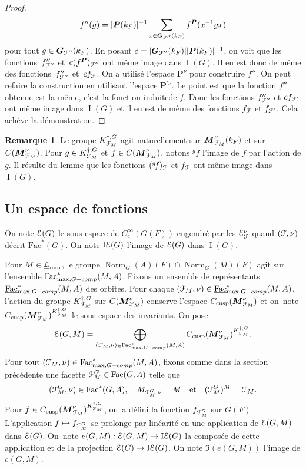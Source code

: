 \documentclass[11pt]{article}
\numberwithin{equation}{section}\providecommand{\og}{«\,}\providecommand{\fg}{\,»}
\let\mathcal \EuScript
\newcommand{\quadet}{\quad\text{et}\quad}
\newcommand\mto{\mathchoice{\longmapsto}{\mapsto}{\mapsto}{\mapsto}}
\newcommand{\gf}{{}^g\!f}
\newcommand{\rc}{\mathrm{c}}
\newcommand{\tcomp}{\textup{-comp}}
\newcommand{\cusp}{\mathrm{cusp}}
\newcommand{\Fac}{\mathrm{Fac}}
\DeclareMathOperator{\rI}{I}
\DeclareMathOperator{\rIE}{I\cE}
\DeclareMathOperator{\Norm}{Norm}
\newcommand{\bG}{\boldsymbol{G}}
\newcommand{\bM}{\boldsymbol{M}}
\newcommand{\bP}{\boldsymbol{P}}
\newcommand{\cE}{\mathcal{E}}
\newcommand{\cF}{\mathcal{F}}
\newcommand{\cL}{\mathcal{L}}
\theoremstyle{plain}
\theoremstyle{definition}
\newtheorem*{rem*}{Remarque}
\begin{document}
\begin{proof}
\[
f''(g)=\vert \bP(k_{F})\vert ^{-1}\sum_{x\in \bG_{\cF''}(k_{F})}f^{\bP}(x^{-1}gx)
\]
pour tout $g\in \bG_{\cF''}(k_{F})$. En posant $c=\vert \bG_{\cF''}(k_{F})\vert \vert \bP(k_{F})\vert ^{-1}$, on voit que les \hbox{fonctions~$f''_{\cF''}$} et~$c(f^{\bP})_{\cF''}$ ont même image dans $\rI(G)$. Il en est donc de même des fonctions~$f''_{\cF''}$ et~$cf_{\cF}$. On a utilisé l'espace $\bP^{\nu}$ pour construire $f''$. On peut refaire la construction en utilisant l'espace $\bP^{\prime\nu}$. Le point est que la fonction $f''$ obtenue est la même, c'est la fonction \og induite\fg de $f$. Donc les fonctions $f''_{\cF''}$ et $cf_{\cF'}$ ont même image dans $\rI(G)$ et il en est de même des fonctions $f_{\cF}$ et $f_{\cF'}$. Cela achève la démonstration.
\end{proof}

\begin{rem*}
Le groupe $ K_{\cF_{M}}^{\dag,G}$ agit naturellement sur $\bM_{\cF_{M}}^{\nu}(k_{F})$ et sur $C(\bM_{\cF_{M}}^{\nu})$. Pour $g\in K_{\cF_{M}}^{\dag,G}$ et $f\in C(\bM_{\cF_{M}}^{\nu})$, notons $\gf$ l'image de $f$ par l'action de $g$. Il résulte du lemme que les fonctions $(\gf)_{\cF}$ et $f_{\cF}$ ont même image dans $\rI(G)$.
\end{rem*}

\subsection{Un espace de fonctions}\label{unespacedefonctions}

On note $\cE(G)$ le sous-espace de $C_{\rc}^{\infty}(G(F))$ engendré par les $\cE_{\cF}^{\nu}$ quand $(\cF,\nu)$ décrit $\Fac^*(G)$. On note $\rIE(G)$ l'image de $\cE(G)$ dans $\rI(G)$.

Pour $M\in \underline{\cL}_{\min}$, le groupe $\Norm_{G}(A)(F)\cap \Norm_{G}(M)(F)$ agit sur l'ensemble $\Fac^*_{\max,G\tcomp}(M,A)$. Fixons un ensemble de représentants $ \underline{\Fac}^*_{\max,G\tcomp}(M,A)$ des orbites. Pour chaque $(\cF_{M},\nu)\in \underline{\Fac}^*_{\max,G\tcomp}(M,A)$, l'action du groupe $K_{\cF_{M}}^{\dag,G}$ sur $C(\bM_{\cF_{M}}^{\nu})$ conserve l'espace $C_{\cusp}(\bM^{\nu}_{\cF_{M}})$ et on~note $C_{\cusp}(\bM^{\nu}_{\cF_{M}})^{K_{\cF_{M}}^{\dag,G}}$ le sous-espace des invariants.
On pose
\[
\cE(G,M)=\bigoplus_{(\cF_{M},\nu)\in \underline{\Fac}^*_{\max,G\tcomp}(M,A)}C_{\cusp}(\bM^{\nu}_{\cF_{M}})^{K_{\cF_{M}}^{\dag,G}}.
\]
Pour tout $(\cF_{M},\nu)\in \underline{\Fac}^*_{\max,G\tcomp}(M,A)$, fixons comme dans la section précédente une facette $\cF_{M}^G\in \Fac(G,A)$ telle que
\[
(\cF_{M}^G,\nu)\in \Fac^*(G,A),\quad M_{\cF_{M}^G,\nu}=M\quadet (\cF_{M}^G)^M=\cF_{M}.
\]
Pour $f\in C_{\cusp}(\bM^{\nu}_{\cF_{M}})^{K_{\cF_{M}}^{\dag,G}}$, on~a défini la fonction $f_{\cF_{M}^G}$ sur $G(F)$. L'application $f\mto f_{\cF_{M}^G}$ se prolonge par linéarité en une application de $\cE(G,M)$ dans $\cE(G)$.
On~note $e(G,M):\cE(G,M)\to \rIE(G)$ la composée de cette application et de la projection $\cE(G)\to \rIE(G)$. On note $ \Im(e(G,M))$ l'image de $e(G,M)$.
\end{document}
